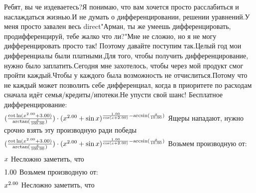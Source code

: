 Ребят, вы че издеваетесь?Я понимаю, что вам хочется просто расслабиться и наслаждаться жизнью.И не думать о дифференцировании, решении уравнений.У меня просто завален весь direct"Арман, ты же умеешь дифференцировать, продифференцируй, тебе жалко что ли?"Мне не сложно, но я не могу дифференцировать просто так! Поэтому давайте поступим так.Целый год мои дифференциалы были платными.Для того, чтобы получить дифференцирование, нужно было заплатить.Сегодня мне захотелось, чтобы через мой продукт смог пройти каждый.Чтобы у каждого была возможность не отчислиться.Потому что не каждый может позволить себе дифференциал, когда в приоритете по расходам сначала идёт семья/кредиты/ипотеки.Не упусти свой шанс! Бесплатное дифференцирование: 
\begin{gather}
\end{gather}
\begin{math}
(\frac {\cot \ln (x ^ {2.00 }+ 3.00 )}{\arctan (\frac {x }{100.00 })})\cdot (x ^ {2.00 }+ \sin x )^ {\frac {1.00 }{\cos (x + 2.00 )}- \arcsin (\frac {x }{10.00 })}\\
\end{math}
Ящеры нападают, нужно срочно взять эту производную ради победы
\begin{gather}
\end{gather}
\begin{math}
(\frac {\cot \ln (x ^ {2.00 }+ 3.00 )}{\arctan (\frac {x }{100.00 })})\cdot (x ^ {2.00 }+ \sin x )^ {\frac {1.00 }{\cos (x + 2.00 )}- \arcsin (\frac {x }{10.00 })}\\
\end{math}
Возьмем производную от:
\begin{gather}
\end{gather}
\begin{math}
x \\
\end{math}
Несложно заметить, что
\begin{gather}
\end{gather}
\begin{math}
1.00 \\
\end{math}
Возьмем производную от:
\begin{gather}
\end{gather}
\begin{math}
x ^ {2.00 }\\
\end{math}
Несложно заметить, что
\begin{gather}
\end{gather}
